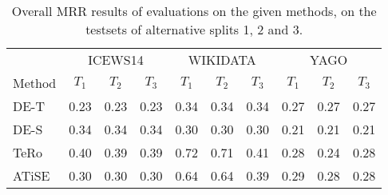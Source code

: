 \begin{table*}[htb]
\centering
\begin{minipage}{0.95\textwidth}
\centering
\caption{Overall MRR results of evaluations on the given methods, on the testsets of alternative splits 1, 2 and 3.}
\vspace{-3mm}

\begin{tabular}{l|ccc|ccc|ccc}
\hline
 & \multicolumn{3}{c|}{ICEWS14} & \multicolumn{3}{c|}{WIKIDATA} & \multicolumn{3}{c}{YAGO}\\
Method & $T_1$ & $T_2$ & $T_3$ & $T_1$ & $T_2$ & $T_3$ & $T_1$ & $T_2$ & $T_3$ \\
\hline
DE-T     & 0.23 & 0.23 & 0.23 & 0.34 & 0.34 & 0.34 & 0.27 & 0.27 & 0.27 \\
DE-S     & 0.34 & 0.34 & 0.34 & 0.30 & 0.30 & 0.30 & 0.21 & 0.21 & 0.21 \\
TeRo     & 0.40 & 0.39 & 0.39 & 0.72 & 0.71 & 0.41 & 0.28 & 0.24 & 0.28 \\
ATiSE    & 0.30 & 0.30 & 0.30 & 0.64 & 0.64 & 0.39 & 0.29 & 0.28 & 0.28 \\
\hline

\end{tabular}

\label{tab:split_results}
\end{minipage}
\end{table*}
